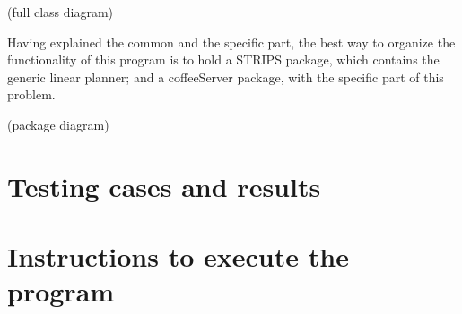 \documentclass[12pt,a4paper,oneside]{article}
\numberwithin{equation}{section}
\numberwithin{equation}{section}
\theoremstyle{definition}
\begin{document}
(full class diagram)

Having explained the common and the specific part, the best way to organize the functionality of this program is to hold a STRIPS package, which contains the generic linear planner; and a coffeeServer package, with the specific part of this problem.

(package diagram)

\section{Testing cases and results}



\section{Instructions to execute the program}
\end{document}
